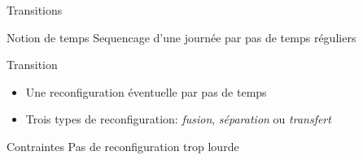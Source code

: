 \documentclass[tikz]{beamer}
\begin{document}
\begin{frame}{Transitions}
  \begin{block}{Notion de temps}
    Sequencage d'une journée par pas de temps réguliers
  \end{block}
  \begin{block}{Transition}
    \begin{itemize}
      \item Une reconfiguration éventuelle par pas de temps
      \item Trois types de reconfiguration: \emph{fusion}, \emph{séparation} ou
        \emph{transfert}
    \end{itemize}
  \end{block}
  \begin{block}{Contraintes}
    Pas de reconfiguration trop lourde
  \end{block}
\end{frame}
\end{document}
